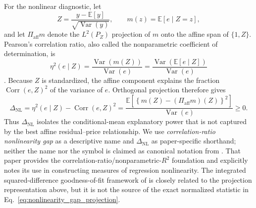 \documentclass[10pt]{article}
\theoremstyle{definition}
\newcommand{\E}{\mathbb{E}}
\newcommand{\Corr}{\operatorname{Corr}}
\newcommand{\Var}{\operatorname{Var}}
\newcommand{\1}{\mathbf{1}}
\begin{document}
For the nonlinear diagnostic, let
\[
Z=\frac{y-\E[y]}{\sqrt{\Var(y)}},
\qquad
m(z)=\E[e\mid Z=z],
\]
and let $\Pi_{\mathrm{aff}}m$ denote the $L^2(P_Z)$ projection of $m$ onto the
affine span of $\{1,Z\}$. Pearson's correlation ratio, also called the
nonparametric coefficient of determination, is
\[
\eta^2(e\mid Z)
=
\frac{\Var\!\left(m(Z)\right)}{\Var(e)}
=
\frac{\Var\!\left(\E[e\mid Z]\right)}{\Var(e)}
\]
\cite{DoksumSamarov1995}. Because $Z$ is standardized, the affine component explains
the fraction $\Corr(e,Z)^2$ of the variance of $e$. Orthogonal projection therefore
gives
\begin{equation}
\label{eq:nonlinearity_gap_projection}
\Delta_{\mathrm{NL}}
=
\eta^2(e\mid Z)-\Corr(e,Z)^2
=
\frac{
\E\!\left[
\left\{
m(Z)-(\Pi_{\mathrm{aff}}m)(Z)
\right\}^2
\right]
}{
\Var(e)
}
\geq 0.
\end{equation}
Thus $\Delta_{\mathrm{NL}}$ isolates the conditional-mean explanatory power that is
not captured by the best affine residual--price relationship. We use
\emph{correlation-ratio nonlinearity gap} as a descriptive name and
$\Delta_{\mathrm{NL}}$ as paper-specific shorthand; neither the name nor the symbol
is claimed as canonical notation from \textcite{DoksumSamarov1995}. That paper
provides the correlation-ratio/nonparametric-$R^2$ foundation and explicitly notes
its use in constructing measures of regression nonlinearity. The integrated
squared-difference goodness-of-fit framework of \textcite{HardleMammen1993} is
closely related to the projection representation above, but it is not the source of
the exact normalized statistic in Eq.~\eqref{eq:nonlinearity_gap_projection}.
\end{document}
